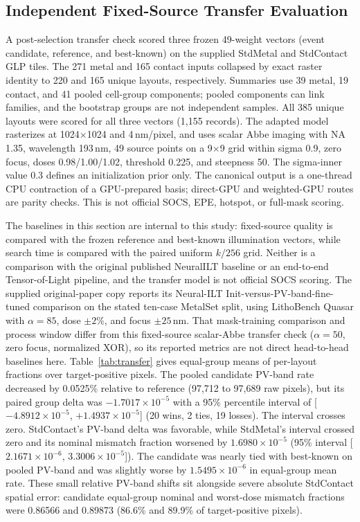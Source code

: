 \documentclass[conference]{IEEEtran}
\begin{document}
\subsection{Independent Fixed-Source Transfer Evaluation}
\label{sec:independent-transfer}
A post-selection transfer check scored three frozen 49-weight vectors (event candidate, reference, and best-known) on the supplied StdMetal and StdContact GLP tiles. The 271 metal and 165 contact inputs collapsed by exact raster identity to 220 and 165 unique layouts, respectively. Summaries use 39 metal, 19 contact, and 41 pooled cell-group components; pooled components can link families, and the bootstrap groups are not independent samples. All 385 unique layouts were scored for all three vectors (1,155 records). The adapted model rasterizes at 1024$\times$1024 and 4\,nm/pixel, and uses scalar Abbe imaging with NA 1.35, wavelength 193\,nm, 49 source points on a 9$\times$9 grid within sigma 0.9, zero focus, doses 0.98/1.00/1.02, threshold 0.225, and steepness 50. The sigma-inner value 0.3 defines an initialization prior only. The canonical output is a one-thread CPU contraction of a GPU-prepared basis; direct-GPU and weighted-GPU routes are parity checks. This is not official SOCS, EPE, hotspot, or full-mask scoring.

The baselines in this section are internal to this study: fixed-source quality is compared with the frozen reference and best-known illumination vectors, while search time is compared with the paired uniform $k/256$ grid. Neither is a comparison with the original published NeuralILT baseline or an end-to-end Tensor-of-Light pipeline, and the transfer model is not official SOCS scoring. The supplied original-paper copy reports its Neural-ILT Init-versus-PV-band-fine-tuned comparison on the stated ten-case MetalSet split, using LithoBench Quasar with $\alpha=85$, dose $\pm2\%$, and focus $\pm25$\,nm. That mask-training comparison and process window differ from this fixed-source scalar-Abbe transfer check ($\alpha=50$, zero focus, normalized XOR), so its reported metrics are not direct head-to-head baselines here. Table~\ref{tab:transfer} gives equal-group means of per-layout fractions over target-positive pixels. The pooled candidate PV-band rate decreased by 0.0525\% relative to reference (97,712 to 97,689 raw pixels), but its paired group delta was $-1.7017\times10^{-5}$ with a 95\% percentile interval of [$-4.8912\times10^{-5}$, $+1.4937\times10^{-5}$] (20 wins, 2 ties, 19 losses). The interval crosses zero. StdContact's PV-band delta was favorable, while StdMetal's interval crossed zero and its nominal mismatch fraction worsened by $1.6980\times10^{-5}$ (95\% interval [$2.1671\times10^{-6}$, $3.3006\times10^{-5}$]). The candidate was nearly tied with best-known on pooled PV-band and was slightly worse by $1.5495\times10^{-6}$ in equal-group mean rate. These small relative PV-band shifts sit alongside severe absolute StdContact spatial error: candidate equal-group nominal and worst-dose mismatch fractions were 0.86566 and 0.89873 (86.6\% and 89.9\% of target-positive pixels).
\end{document}
